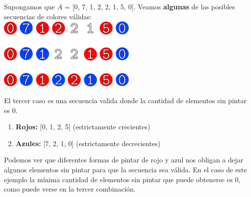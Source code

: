Supongamos que $A$ = [0, 7, 1, 2, 2, 1, 5, 0]. Veamos \textbf{algunas} de las posibles secuencias de colores válidas: \\

{\centering 
  \includegraphics[width=0.50\textwidth]{informe/img/ejemplos/ejemplo1_finalsmall.png} \\
}

\vspace{1cm}
El tercer caso es una secuencia valida donde la cantidad de elementos sin pintar es 0.
\begin{enumerate}
\item \textcolor{rojo}{\textbf{Rojos:}} [0, 1, 2, 5]  (estrictamente crecientes)
\item \textcolor{azul}{\textbf{Azules:}} [7, 2, 1, 0]  (estrictamente decrecientes)
\end{enumerate}

Podemos ver que diferentes formas de pintar de rojo y azul nos obligan a dejar algunos elementos sin pintar para que la secuencia sea válida. En el caso de este ejemplo la mínima cantidad de elementos sin pintar que puede obtenerse es 0, como puede verse en la tercer combinación. \\
